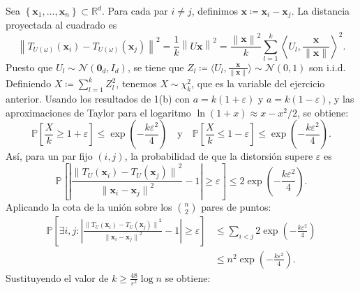 \begin{enumerate}
	      Sea $\left\{\symbf{x}_{1},\dotsc,\symbf{x}_{n}\right\}\subset\mathbb{R}^{d}$.
	      Para cada par $i\neq j$, definimos $\symbf{x} \coloneqq \symbf{x}_i - \symbf{x}_j$.
	      La distancia proyectada al cuadrado es
	      \begin{equation*}
		      {\left\|
			      T_{U\left(\omega\right)}\left(\symbf{x}_{i}\right)-
			      T_{U\left(\omega\right)}\left(\symbf{x}_{j}\right)
			      \right\|}^{2} =
		      \frac{1}{k} {\left\| U \symbf{x} \right\|}^2 =
		      \frac{{\left\| \symbf{x} \right\|}^2}{k} \sum_{l=1}^k {\left\langle U_l, \frac{\symbf{x}}{\|\symbf{x}\|} \right\rangle}^2.
	      \end{equation*}
	      Puesto que $U_l \sim \mathcal{N}(\symbf{0}_d, I_d)$, se tiene que $Z_l \coloneqq \langle U_l, \frac{\symbf{x}}{\|\symbf{x}\|} \rangle \sim \mathcal{N}(0, 1)$ son i.i.d.
	      Definiendo $X \coloneqq \sum_{l=1}^k Z_l^2$, tenemos $X \sim \chi^2_k$, que es la variable del ejercicio anterior.
	      Usando los resultados de 1(b) con $a = k(1+\varepsilon)$ y $a = k(1-\varepsilon)$, y las aproximaciones de Taylor para el logaritmo $\ln(1+x) \approx x - x^2/2$, se obtiene:
	      \begin{equation*}
		      \mathbb{P} \left[ \frac{X}{k} \geq 1+\varepsilon \right] \leq \exp\left( - \frac{k\varepsilon^2}{4} \right) \quad \text{y} \quad \mathbb{P} \left[ \frac{X}{k} \leq 1-\varepsilon \right] \leq \exp\left( - \frac{k\varepsilon^2}{4} \right).
	      \end{equation*}
	      Así, para un par fijo $(i, j)$, la probabilidad de que la distorsión supere $\varepsilon$ es
	      \begin{equation*}
		      \mathbb{P} \left[ \left| \frac{{\| T_{U}(\symbf{x}_i) - T_{U}(\symbf{x}_j) \|}^2}{{\| \symbf{x}_i - \symbf{x}_j \|}^2} - 1 \right| \geq \varepsilon \right] \leq 2 \exp\left( - \frac{k\varepsilon^2}{4} \right).
	      \end{equation*}
	      Aplicando la cota de la unión sobre los $\binom{n}{2}$ pares de puntos:
	      \begin{align*}
		      \mathbb{P} \left[ \exists i,j : \left| \frac{{\| T_{U}(\symbf{x}_i) - T_{U}(\symbf{x}_j) \|}^2}{{\| \symbf{x}_i - \symbf{x}_j \|}^2} - 1 \right| \geq \varepsilon \right]
		       & \leq \sum_{i<j} 2 \exp\left( - \frac{k\varepsilon^2}{4} \right) \\
		       & \leq n^2 \exp\left( - \frac{k\varepsilon^2}{4} \right).
	      \end{align*}
	      Sustituyendo el valor de $k \geq \frac{48}{\varepsilon^2} \log n$ se obtiene:

\end{enumerate}
